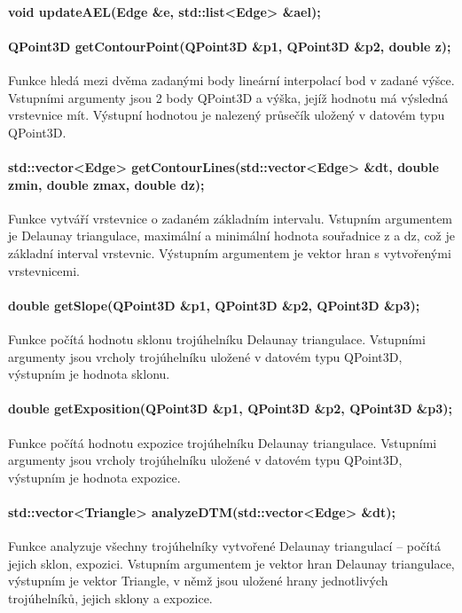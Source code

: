 \documentclass[11pt]{article}
\begin{document}
\paragraph {void updateAEL(Edge \&e, std::list<Edge> \&ael);}

\paragraph {QPoint3D getContourPoint(QPoint3D \&p1, QPoint3D \&p2, double z);}
Funkce hledá mezi dvěma zadanými body lineární interpolací bod v zadané výšce. Vstupními argumenty jsou 2 body QPoint3D a výška, jejíž hodnotu má výsledná vrstevnice mít. Výstupní hodnotou je nalezený průsečík uložený v datovém typu QPoint3D.

\paragraph {std::vector<Edge> getContourLines(std::vector<Edge> \&dt, double zmin, double zmax, double dz);}
Funkce vytváří vrstevnice o zadaném základním intervalu. Vstupním argumentem je De\-launay triangulace, maximální a minimální hodnota souřadnice z a dz, což je základní interval vrstevnic. Výstupním argumentem je vektor hran s vytvořenými vrstevnicemi.

\paragraph {double getSlope(QPoint3D \&p1, QPoint3D \&p2, QPoint3D \&p3);}
Funkce počítá hodnotu sklonu trojúhelníku Delaunay triangulace. Vstupními argumenty jsou vrcholy trojúhelníku uložené v datovém typu QPoint3D, výstupním je hodnota sklonu.

\paragraph {double getExposition(QPoint3D \&p1, QPoint3D \&p2, QPoint3D \&p3);}
Funkce počítá hodnotu expozice trojúhelníku Delaunay triangulace. Vstupními argumenty jsou vrcholy trojúhelníku uložené v datovém typu QPoint3D, výstupním je hodnota expozice.

\paragraph {std::vector<Triangle> analyzeDTM(std::vector<Edge> \&dt);}
Funkce analyzuje všechny trojúhelníky vytvořené Delaunay triangulací – počítá jejich sklon, expozici. Vstupním argumentem je vektor hran Delaunay triangulace, výstupním je vektor Triangle, v němž jsou uložené hrany jednotlivých trojúhelníků, jejich sklony a expozice.
\end{document}
